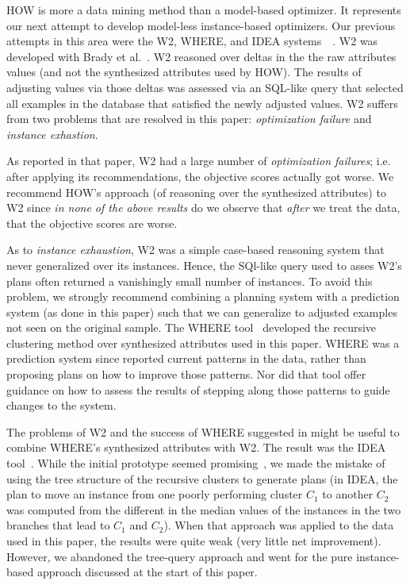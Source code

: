 HOW is more a data mining method than a model-based optimizer. It represents our next attempt
to develop model-less instance-based optimizers.  Our previous attempts in this area
were the W2, WHERE, and IDEA systems~~\cite{menzies13:brady,Menzies2013:local,me12c}.
W2 was developed with Brady et al.~\cite{menzies13:brady}. 
W2 reasoned over deltas in the the raw
attributes values (and not the synthesized attributes used by HOW). 
The results of  adjusting values via those deltas was assessed via an SQL-like
query that selected all examples in the database that satisfied the newly adjusted
values. W2 suffers from two problems that are resolved
in this paper: {\em optimization failure} and {\em instance exhastion}.
\bi
\item 
As reported in that paper, W2
had a large number of {\em optimization failures}; i.e. after applying its recommendations,
the objective scores actually got worse. We recommend HOW's approach (of reasoning
over the synthesized attributes) to W2 since {\em in none of the above
results} do we observe that {\em after} we treat the data, that the objective scores are worse.
\item
As to {\em instance exhaustion}, W2 was a simple case-based reasoning system that never generalized
over its instances. Hence, the SQl-like query used to asses W2's plans often returned
a vanishingly small number of instances. To avoid this problem, we strongly recommend
combining a planning system with a prediction system (as done in this paper) such that we can
generalize to adjusted examples not seen on the original sample.
\ei
The WHERE tool~\cite{Menzies2013:local} developed the recursive clustering method over synthesized attributes
  used in this paper. WHERE was   a prediction
system since reported current patterns in the data, rather than proposing plans
on how to improve those patterns. Nor did that tool offer guidance on how to assess
the results of stepping along those patterns to guide changes to the system.

The problems of W2 and the success of WHERE suggested in might be useful to combine
WHERE's synthesized attributes with W2. The result was the IDEA tool~\cite{me12c}. 
While the initial prototype seemed promising~\cite{me12c}, we made the mistake of using
the tree structure of the recursive clusters to generate plans (in IDEA, the plan to
move an instance from one poorly performing cluster $C_1$ to another $C_2$ was computed
from the different in the  median
values of the instances in the two  branches that lead to $C_1$ and $C_2$).  When
that approach was applied to the data used in this paper, the results were quite weak
(very little net improvement). However, we abandoned the tree-query approach
and went for the pure instance-based approach discussed at the start of this paper.


